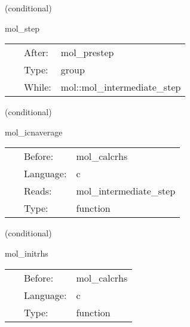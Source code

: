\vspace{5mm}

   (conditional) 

\hspace{5mm} mol\_step 

\hspace{5mm}{\it the loop over the intermediate steps for the ode integrator } 


\hspace{5mm}

 \begin{tabular*}{160mm}{cll} 
~ & After:  & mol\_prestep \\ 
~ & Type:  & group \\ 
~ & While:  & mol::mol\_intermediate\_step \\ 
\end{tabular*} 


\vspace{5mm}

   (conditional) 

\hspace{5mm} mol\_icnaverage 

\hspace{5mm}{\it averages the time levels for the averaging icn method } 


\hspace{5mm}

 \begin{tabular*}{160mm}{cll} 
~ & Before:  & mol\_calcrhs \\ 
~ & Language:  & c \\ 
~ & Reads:  & mol\_intermediate\_step \\ 
~ & Type:  & function \\ 
\end{tabular*} 


\vspace{5mm}

   (conditional) 

\hspace{5mm} mol\_initrhs 

\hspace{5mm}{\it initialise the rhs functions } 


\hspace{5mm}

 \begin{tabular*}{160mm}{cll} 
~ & Before:  & mol\_calcrhs \\ 
~ & Language:  & c \\ 
~ & Type:  & function \\ 
\end{tabular*} 



